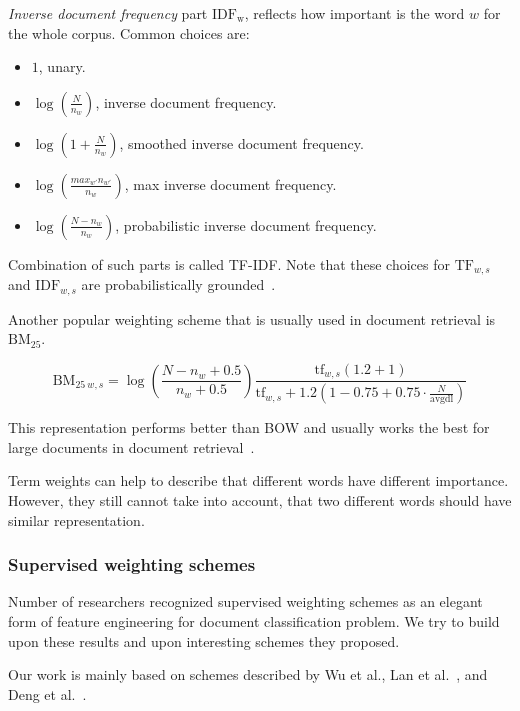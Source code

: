     \emph{Inverse document frequency} part $\mathrm{IDF_w}$, reflects how important is the word $w$ for the whole corpus.
    Common choices are:
    \begin{itemize}
        \item $1$, unary.
        \item $\log \left(\frac{N}{n_w} \right)$, inverse document frequency.
        \item $\log \left( 1+\frac{N}{n_w} \right)$, smoothed inverse document frequency.
        \item $\log \left( \frac{max_{w'} n_{w'}}{n_w} \right)$, max inverse document frequency.
        \item $\log \left(\frac{N-n_w}{n_w} \right)$, probabilistic inverse document frequency.
    \end{itemize}

    Combination of such parts is called TF-IDF.
    Note that these choices for $\mathrm{TF}_{w,s}$ and $\mathrm{IDF}_{w,s}$ are probabilistically grounded~\cite{aizawa2003information}. %
    
    Another popular weighting scheme that is usually used in document retrieval is $\mathrm{BM_{25}}$. 
    
    $$\mathrm{BM}_{25~w,s} = \log \left(\frac{N-n_w+0.5}{n_w + 0.5}\right)    \frac{\mathrm{tf}_{w,s} (1.2 + 1)}{\mathrm{tf}_{w,s} + 1.2  \left(1 - 0.75 + 0.75 \cdot \frac{N}{\text{avgdl}}\right)}$$
    
    This representation performs better than BOW and usually works the best for large documents in document retrieval~\cite{li2014semantic}.
    
    Term weights can help to describe that different words have different importance.
    However, they still cannot take into account, that two different words should have similar representation.
    
    \subsubsection{Supervised weighting schemes} \label{sec:supervised:weights}
    Number of researchers recognized supervised weighting schemes as an elegant form of feature engineering for document classification problem.
    We try to build upon these results and upon interesting schemes they proposed.
    
    Our work is mainly based on schemes described by Wu et al.\cite{wu2017balancing}, %
    Lan et al.~\cite{lan2009supervised}, %
    and Deng et al.~\cite{deng2014study}. %
    
